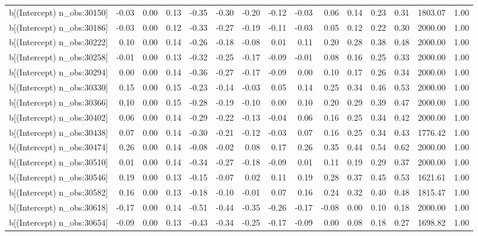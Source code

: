 \begin{table}[ht]
\begin{tabular}{rrrrrrrrrrrrrrr}
  b[(Intercept) n\_obs:30150] & -0.03 & 0.00 & 0.13 & -0.35 & -0.30 & -0.20 & -0.12 & -0.03 & 0.06 & 0.14 & 0.23 & 0.31 & 1803.07 & 1.00 \\ 
  b[(Intercept) n\_obs:30186] & -0.03 & 0.00 & 0.12 & -0.33 & -0.27 & -0.19 & -0.11 & -0.03 & 0.05 & 0.12 & 0.22 & 0.30 & 2000.00 & 1.00 \\ 
  b[(Intercept) n\_obs:30222] & 0.10 & 0.00 & 0.14 & -0.26 & -0.18 & -0.08 & 0.01 & 0.11 & 0.20 & 0.28 & 0.38 & 0.48 & 2000.00 & 1.00 \\ 
  b[(Intercept) n\_obs:30258] & -0.01 & 0.00 & 0.13 & -0.32 & -0.25 & -0.17 & -0.09 & -0.01 & 0.08 & 0.16 & 0.25 & 0.33 & 2000.00 & 1.00 \\ 
  b[(Intercept) n\_obs:30294] & 0.00 & 0.00 & 0.14 & -0.36 & -0.27 & -0.17 & -0.09 & 0.00 & 0.10 & 0.17 & 0.26 & 0.34 & 2000.00 & 1.00 \\ 
  b[(Intercept) n\_obs:30330] & 0.15 & 0.00 & 0.15 & -0.23 & -0.14 & -0.03 & 0.05 & 0.14 & 0.25 & 0.34 & 0.46 & 0.53 & 2000.00 & 1.00 \\ 
  b[(Intercept) n\_obs:30366] & 0.10 & 0.00 & 0.15 & -0.28 & -0.19 & -0.10 & 0.00 & 0.10 & 0.20 & 0.29 & 0.39 & 0.47 & 2000.00 & 1.00 \\ 
  b[(Intercept) n\_obs:30402] & 0.06 & 0.00 & 0.14 & -0.29 & -0.22 & -0.13 & -0.04 & 0.06 & 0.16 & 0.25 & 0.34 & 0.42 & 2000.00 & 1.00 \\ 
  b[(Intercept) n\_obs:30438] & 0.07 & 0.00 & 0.14 & -0.30 & -0.21 & -0.12 & -0.03 & 0.07 & 0.16 & 0.25 & 0.34 & 0.43 & 1776.42 & 1.00 \\ 
  b[(Intercept) n\_obs:30474] & 0.26 & 0.00 & 0.14 & -0.08 & -0.02 & 0.08 & 0.17 & 0.26 & 0.35 & 0.44 & 0.54 & 0.62 & 2000.00 & 1.00 \\ 
  b[(Intercept) n\_obs:30510] & 0.01 & 0.00 & 0.14 & -0.34 & -0.27 & -0.18 & -0.09 & 0.01 & 0.11 & 0.19 & 0.29 & 0.37 & 2000.00 & 1.00 \\ 
  b[(Intercept) n\_obs:30546] & 0.19 & 0.00 & 0.13 & -0.15 & -0.07 & 0.02 & 0.11 & 0.19 & 0.28 & 0.37 & 0.45 & 0.53 & 1621.61 & 1.00 \\ 
  b[(Intercept) n\_obs:30582] & 0.16 & 0.00 & 0.13 & -0.18 & -0.10 & -0.01 & 0.07 & 0.16 & 0.24 & 0.32 & 0.40 & 0.48 & 1815.47 & 1.00 \\ 
  b[(Intercept) n\_obs:30618] & -0.17 & 0.00 & 0.14 & -0.51 & -0.44 & -0.35 & -0.26 & -0.17 & -0.08 & 0.00 & 0.10 & 0.18 & 2000.00 & 1.00 \\ 
  b[(Intercept) n\_obs:30654] & -0.09 & 0.00 & 0.13 & -0.43 & -0.34 & -0.25 & -0.17 & -0.09 & 0.00 & 0.08 & 0.18 & 0.27 & 1698.82 & 1.00 \\ 

\end{tabular}
\end{table}
